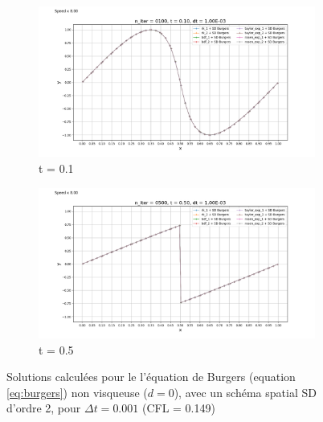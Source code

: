     \begin{figure}
        \centering
        \begin{subfigure}{.5\textwidth}
            \centering
            \includegraphics[width=\textwidth]{images/results/edp_burgers_1.png}
            \caption{t = 0.1}
        \label{fig:edp_burgers_1}
        \end{subfigure}%
        \begin{subfigure}{.5\textwidth}
            \centering
            \includegraphics[width=\textwidth]{images/results/edp_burgers_2.png}
            \caption{t = 0.5}
        \label{fig:edp_burgers_2}
        \end{subfigure}
        \caption{Solutions calculées pour le l'équation de Burgers (equation \ref{eq:burgers}) non visqueuse ($d = 0$), avec un schéma spatial SD d'ordre 2, pour $\Delta t = 0.001$ (CFL = 0.149)}
    \label{fig:edp_burgers}
    \end{figure}

